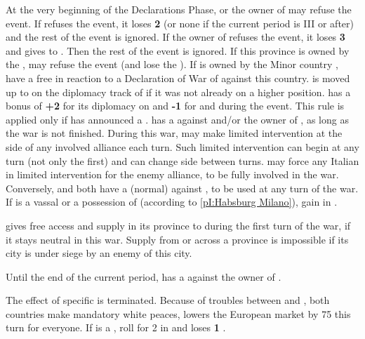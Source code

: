 \phdipl
{}
\bparag At the very beginning of the Declarations Phase, \FRA or the owner of
\provinceLombardia may refuse the event.
\bparag If \FRA refuses the event, it loses {\bf 2} \STAB (or none if the
current period is III or after) and the rest of the event is ignored.
\bparag If the owner of \provinceLombardia refuses the event, it loses {\bf 3}
\STAB and gives \provinceLombardia to \FRA. Then the rest of the event is
ignored. If this province is owned by the \HAB, \SPA may refuse the event (and
lose the \STAB).
If \provinceLombardia is owned by the Minor country \paysMilan, \HAB have a
free \CB in reaction to a Declaration of War of \FRA against this
country. \paysMilan is moved up to \EG on the diplomacy track of \HAB if it
was not already on a higher position.
\FRA has a bonus of {\bf +2} for its diplomacy on \paysToscane and {\bf -1}
for \paysPapaute and \paysParme during the event.
This rule is applied only if \VEN has announced a .
\bparag \VEN has a \CB against \FRA and/or the owner of \provinceLombardia, as
long as the war is not finished.
\bparag During this war, \VEN may make limited intervention at the side of any
involved alliance each turn. Such limited intervention can begin at any turn
(not only the first) and \VEN can change side between turns.  \VEN may force
any Italian \MIN in limited intervention for the enemy alliance, to be fully
involved in the war.
\bparag Conversely, \FRA and \HAB both have a (normal) \CB against \VEN, to be
used at any turn of the war.
If \paysMilan is a vassal or a possession of \HAB (according to
\ref{pI:Habsburg Milano}), \HAB gain \paysSuisse in \CE.

\phmvt
\aparag \paysSavoie gives free access and supply in its province to \FRA
during the first turn of the war, if it stays neutral in this war. Supply from
or across a province is impossible if its city is under siege by an enemy of
this city.

\effetlong
\aparag Until the end of the current period, \FRA has a \CB against the owner
of \provinceLombardia.





\phevnt
\aparag The effect of specific  is
terminated.
\aparag Because of troubles between \paysDanemark and \paysSuede, both
countries make mandatory white peaces, lowers the European market by 75\ducats
this turn for everyone.
\aparag If \SUE is a \MAJ, roll for 2 \REVOLT in \SUE and \SUE loses {\bf 1}
\STAB.



